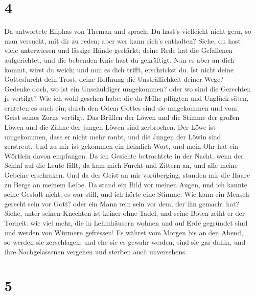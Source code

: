 \hypertarget{section-3}{%
\section{4}\label{section-3}}

 Da antwortete Eliphas von Theman und sprach:
 Du hast's vielleicht nicht gern, so man versucht, mit dir
zu reden; aber wer kann sich's enthalten?  Siehe, du hast
viele unterwiesen und lässige Hände gestärkt;  deine Rede
hat die Gefallenen aufgerichtet, und die bebenden Knie hast du
gekräftigt.  Nun es aber an dich kommt, wirst du weich;
und nun es dich trifft, erschrickst du.  Ist nicht deine
Gottesfurcht dein Trost, deine Hoffnung die Unsträflichkeit deiner Wege?
 Gedenke doch, wo ist ein Unschuldiger umgekommen? oder wo
sind die Gerechten je vertilgt?  Wie ich wohl gesehen
habe: die da Mühe pflügten und Unglück säten, ernteten es auch ein;
 durch den Odem Gottes sind sie umgekommen und vom Geist
seines Zorns vertilgt.  Das Brüllen der Löwen und die
Stimme der großen Löwen und die Zähne der jungen Löwen sind zerbrochen.
 Der Löwe ist umgekommen, dass er nicht mehr raubt, und
die Jungen der Löwin sind zerstreut.  Und zu mir ist
gekommen ein heimlich Wort, und mein Ohr hat ein Wörtlein davon
empfangen.  Da ich Gesichte betrachtete in der Nacht,
wenn der Schlaf auf die Leute fällt,  da kam mich Furcht
und Zittern an, und alle meine Gebeine erschraken.  Und
da der Geist an mir vorüberging, standen mir die Haare zu Berge an
meinem Leibe.  Da stand ein Bild vor meinen Augen, und
ich kannte seine Gestalt nicht; es war still, und ich hörte eine Stimme:
 Wie kann ein Mensch gerecht sein vor Gott? oder ein Mann
rein sein vor dem, der ihn gemacht hat?  Siehe, unter
seinen Knechten ist keiner ohne Tadel, und seine Boten zeiht er der
Torheit:  wie viel mehr, die in Lehmhäusern wohnen und
auf Erde gegründet sind und werden von Würmern gefressen!
 Es währet vom Morgen bis an den Abend, so werden sie
zerschlagen; und ehe sie es gewahr werden, sind sie gar dahin,
 und ihre Nachgelassenen vergehen und sterben auch
unversehens.

\hypertarget{section-4}{%
\section{5}\label{section-4}}

